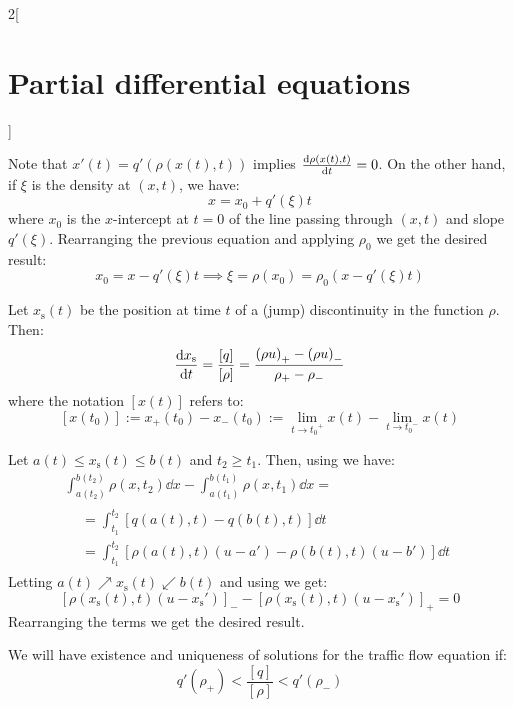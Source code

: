 \documentclass[../../../main_math.tex]{subfiles}
\begin{document}
\begin{multicols}{2}[\section{Partial differential equations}]
\begin{proposition}
  \end{proposition}
  \begin{sproof}
    Note that $x'(t)=q'(\rho(x(t),t))$ implies $\dv{\rho(x(t),t)}{t}=0$. On the other hand, if $\xi$ is the density at $(x,t)$, we have: $$x=x_0+q'(\xi)t$$ where $x_0$ is the $x$-intercept at $t=0$ of the line passing through $(x,t)$ and slope $q'(\xi)$. Rearranging the previous equation and applying $\rho_0$ we get the desired result:
    $$x_0=x-q'(\xi)t\implies \xi=\rho(x_0)=\rho_0(x-q'(\xi)t)$$
  \end{sproof}
  \begin{center}
    \begin{minipage}{\linewidth}
      \centering
      
      \label{PDE:traffic-char}
    \end{minipage}
  \end{center}
  \begin{proposition}
    Let $x_\mathrm{s}(t)$ be the position at time $t$ of a (jump) discontinuity in the function $\rho$. Then: $$\dv{x_\mathrm{s}}{t}=\frac{[q]}{[\rho]}=\frac{{(\rho u)}_+-{(\rho u)}_-}{\rho_+-\rho_-}$$ where the notation $[x(t)]$ refers to: $$[x(t_0)]:=x_+(t_0)-x_-(t_0):=\lim_{t\to{t_0}^+}x(t)-\lim_{t\to{t_0}^-}x(t)$$
  \end{proposition}
  \begin{sproof}
    Let $a(t)\leq x_\mathrm{s}(t)\leq b(t)$ and $t_2\geq t_1$. Then, using  we have:
    \begin{multline*}
      \int_{a(t_2)}^{b(t_2)}\rho(x,t_2)\dd{x}-\int_{a(t_1)}^{b(t_1)}\rho(x,t_1)\dd{x}=\\
      \begin{aligned}
         & =\int_{t_1}^{t_2}[q(a(t),t)-q(b(t),t)]\dd{t}                    \\
         & =\int_{t_1}^{t_2}[\rho(a(t),t)(u-a') -\rho(b(t),t)(u-b')]\dd{t}
      \end{aligned}
    \end{multline*}
    Letting $a(t)\nearrow x_\mathrm{s}(t)\swarrow b(t)$ and using  we get: $$[\rho(x_\mathrm{s}(t),t)(u-{x_\mathrm{s}}')]_-- [\rho(x_\mathrm{s}(t),t)(u-{x_\mathrm{s}}')]_+=0$$
    Rearranging the terms we get the desired result.
  \end{sproof}
  \begin{lemma}
    We will have existence and uniqueness of solutions for the traffic flow equation if: $$q'(\rho_+)<\frac{[q]}{[\rho]}< q'(\rho_-)$$
  \end{lemma}

\end{multicols}
\end{document}
